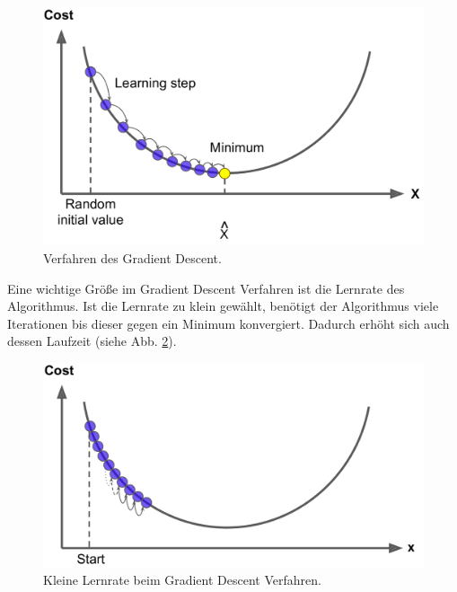 \begin{figure}[hbt]
	\centering
	\includegraphics[scale=0.2]{Bilder/gradient_descent1}
	\caption{Verfahren des Gradient Descent. \cite{aurelien:2017}} 
	\label{fig:gradient_descent1} 
\end{figure}
\noindent
 

\noindent
Eine wichtige Größe im Gradient Descent Verfahren ist die Lernrate des Algorithmus. Ist die Lernrate zu klein gewählt, benötigt der Algorithmus viele Iterationen bis dieser gegen ein Minimum konvergiert. Dadurch erhöht sich auch dessen Laufzeit (siehe Abb. \ref{fig:gradient_descent2}).
\begin{figure}[hbt]
	\centering
	\includegraphics[scale=0.2]{Bilder/gradient_descent2}
	\caption{Kleine Lernrate beim Gradient Descent Verfahren. \cite{aurelien:2017}} 
	\label{fig:gradient_descent2} 
\end{figure}

